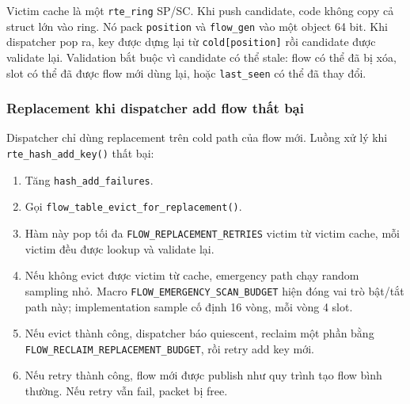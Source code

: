 \documentclass[12pt,a4paper]{report}
\DeclareRobustCommand{\code}[1]{{\small\texttt{#1}}}
\begin{document}
Victim cache là một \code{rte\_ring} SP/SC. Khi push candidate, code không copy cả struct lớn vào ring. Nó pack \code{position} và \code{flow\_gen} vào một object 64 bit. Khi dispatcher pop ra, key được dựng lại từ \code{cold[position]} rồi candidate được validate lại. Validation bắt buộc vì candidate có thể stale: flow có thể đã bị xóa, slot có thể đã được flow mới dùng lại, hoặc \code{last\_seen} có thể đã thay đổi.

\subsubsection{Replacement khi dispatcher add flow thất bại}

Dispatcher chỉ dùng replacement trên cold path của flow mới. Luồng xử lý khi \code{rte\_hash\_add\_key()} thất bại:

\begin{enumerate}
    \item Tăng \code{hash\_add\_failures}.
    \item Gọi \code{flow\_table\_evict\_for\_replacement()}.
    \item Hàm này pop tối đa \code{FLOW\_REPLACEMENT\_RETRIES} victim từ victim cache, mỗi victim đều được lookup và validate lại.
    \item Nếu không evict được victim từ cache, emergency path chạy random sampling nhỏ. Macro \code{FLOW\_EMERGENCY\_SCAN\_BUDGET} hiện đóng vai trò bật/tắt path này; implementation sample cố định 16 vòng, mỗi vòng 4 slot.
    \item Nếu evict thành công, dispatcher báo quiescent, reclaim một phần bằng \code{FLOW\_RECLAIM\_REPLACEMENT\_BUDGET}, rồi retry add key mới.
    \item Nếu retry thành công, flow mới được publish như quy trình tạo flow bình thường. Nếu retry vẫn fail, packet bị free.
\end{enumerate}
\end{document}
